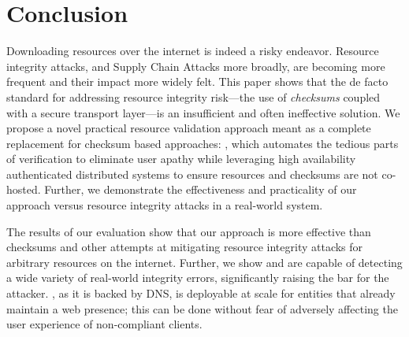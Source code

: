 \section{Conclusion} \label{sec:conclusion}

Downloading resources over the internet is indeed a risky endeavor. Resource
integrity attacks, and Supply Chain Attacks more broadly, are becoming more
frequent and their impact more widely felt. This paper shows that the de facto
standard for addressing resource integrity risk---the use of \emph{checksums}
coupled with a secure transport layer---is an insufficient and often ineffective
solution. We propose a novel practical resource validation approach meant as a
complete replacement for checksum based approaches: \SYSTEM{}, which automates
the tedious parts of verification to eliminate user apathy while leveraging
high availability authenticated distributed systems to ensure resources and
checksums are not co-hosted. Further, we demonstrate the effectiveness and
practicality of our approach versus resource integrity attacks in a real-world
system.

The results of our evaluation show that our approach is more effective than
checksums and other attempts at mitigating resource integrity attacks for
arbitrary resources on the internet. Further, we show \DNSSYS{} and \DHTSYS{}
are capable of detecting a wide variety of real-world integrity errors,
significantly raising the bar for the attacker. \DNSSYS{}, as it is backed by
DNS, is deployable at scale for entities that already maintain a web presence;
this can be done without fear of adversely affecting the user experience of
non-compliant clients.

